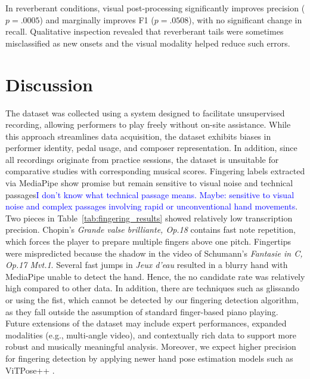 \documentclass{article}
\newcommand{\alex}[1]{\textcolor{blue}{#1}}%
\begin{document}
In reverberant conditions, visual post-processing significantly improves precision ($p = .0005$) and marginally improves F1 ($p = .0508$), with no significant change in recall. Qualitative inspection revealed that reverberant tails were sometimes misclassified as new onsets and the visual modality helped reduce such errors.

 
\section{Discussion}\label{sec:discussion}
The dataset was collected using a system designed to facilitate unsupervised recording, allowing performers to play freely without on-site assistance. While this approach streamlines data acquisition, the dataset exhibits biases in performer identity, pedal usage, and composer representation. In addition, since all recordings originate from practice sessions, the dataset is unsuitable for comparative studies with corresponding musical scores. Fingering labels extracted via MediaPipe show promise but remain sensitive to visual noise and technical passages\alex{I don't know what technical passage means. Maybe: sensitive to visual noise and complex passages involving rapid or unconventional hand movements}. Two pieces in Table~\ref{tab:fingering_results} showed relatively low transcription precision. Chopin's \textit{Grande valse brilliante, Op.18} contains fast note repetition, which forces the player to prepare multiple fingers above one pitch. Fingertips were mispredicted because the shadow in the video of Schumann's \textit{Fantasie in C, Op.17 Mvt.1}. Several fast jumps in \textit{Jeux d'eau} resulted in a blurry  hand with MediaPipe unable to detect the hand. Hence, the no candidate rate was relatively high compared to other data. In addition, there are techniques such as glissando or using the fist, which cannot be detected by our fingering detection algorithm, as they fall outside the assumption of standard finger-based piano playing.\\
Future extensions of the dataset may include expert performances, expanded modalities (e.g., multi-angle video), and contextually rich data to support more robust and musically meaningful analysis. Moreover, we expect higher precision for fingering detection by applying newer hand pose estimation models such as ViTPose++ \cite{ViTPose++}.
 
\end{document}
